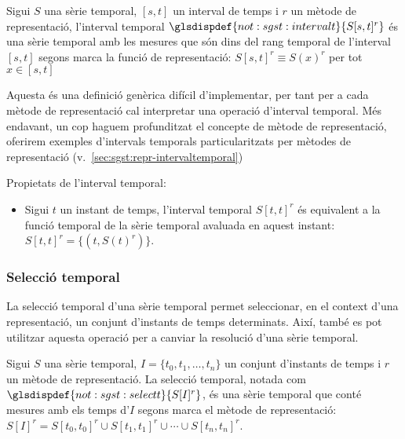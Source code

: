 \begin{definition}
  \label{def:sgst:intervalt}
  Sigui $S$ una sèrie temporal, $[s,t]$ un interval de temps i $r$ un
  mètode de representació, l'interval temporal
  $\glsdispdef{not:sgst:intervalt}{S[s,t]^r}$ és una sèrie temporal
  amb les mesures que són dins del rang temporal de l'interval $[s,t]$
  segons marca la funció de representació: $S[s,t]^r\equiv S(x)^r$ 
  per tot $x \in [s,t]$
\end{definition}

Aquesta és una definició genèrica difícil d'implementar, per tant per
a cada mètode de representació cal interpretar una operació d'interval
temporal. Més endavant, un cop haguem profunditzat el
concepte de mètode de representació, oferirem  exemples
d'intervals temporals particularitzats per mètodes de representació (v.\
\autoref{sec:sgst:repr-intervaltemporal})





Propietats de l'interval temporal:

\begin{itemize}
\item Sigui $t$ un instant de temps, l'interval temporal
  $S[t,t]^r$ és equivalent a la funció temporal de la sèrie
  temporal avaluada en aquest instant: $S[t,t]^r= \{(t,
  S(t)^r)\}$.


\end{itemize}




\subsubsection{Selecció temporal}


La selecció temporal d'una sèrie temporal permet seleccionar, en el
context d'una representació, un conjunt d'instants de temps
determinats.  Així, també es pot utilitzar aquesta operació per a
canviar la resolució d'una sèrie temporal.


\begin{definition}
  \label{def:sgst:selecciot}
  Sigui $S$ una sèrie temporal,
  $I=\{t_0,t_1,\dotsc,t_n\}$ un conjunt d'instants de temps i $r$ un
  mètode de representació. La selecció temporal, notada com
  $\glsdispdef{not:sgst:selectt}{S[I]^r}$, és una sèrie temporal que
  conté mesures amb els temps d'$I$ segons marca el mètode de
  representació: $S[I]^r= S[t_0,t_0]^r \cup S[t_1,t_1]^r \cup \dotsb
  \cup S[t_n,t_n]^r$.
\end{definition}



